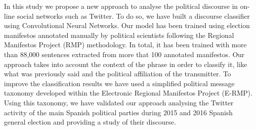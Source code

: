 In this study we propose a new approach to analyse the political discourse in on-line social networks such as Twitter. To do so, we have built a discourse classifier using Convolutional Neural Networks. Our model has been trained using election manifestos annotated manually by political scientists following the Regional Manifestos Project (RMP) methodology. In total, it has been trained with more than 88,000 sentences extracted from more that 100 annotated manifestos. Our approach takes into account the context of the phrase in order to classify it, like what was previously said and the political affiliation of the transmitter. To improve the classification results we have used a simplified political message taxonomy developed within the Electronic Regional Manifestos Project (E-RMP). Using this taxonomy, we have validated our approach analysing the Twitter activity of the main Spanish political parties during 2015 and 2016 Spanish general election and providing a study of their discourse.
